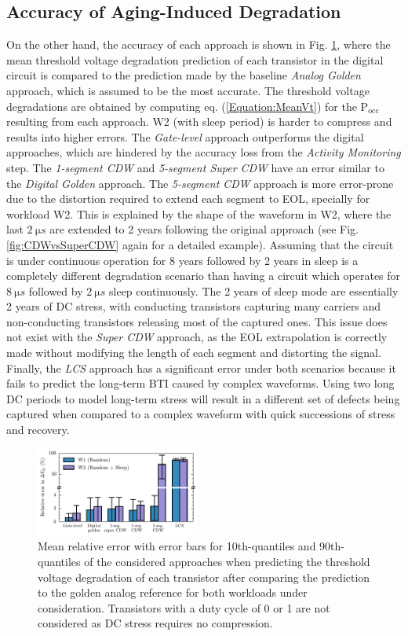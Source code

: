 \subsection{Accuracy of Aging-Induced Degradation}
On the other hand, the accuracy of each approach is shown in Fig. \ref{fig:Mean error}, where the mean threshold voltage degradation prediction of each transistor in the digital circuit is compared to the prediction made by the baseline \textit{Analog Golden} approach, which is assumed to be the most accurate. The threshold voltage degradations are obtained by computing eq. (\ref{Equation:MeanVt}) for the $\text{P}_{\text{occ}}$ resulting from each approach. W2 (with sleep period) is harder to compress and results into higher errors. The \textit{Gate-level} approach outperforms the digital approaches, which are hindered by the accuracy loss from the \textit{Activity Monitoring} step. The \textit{1-segment CDW} and \textit{5-segment Super CDW} have an error similar to the \textit{Digital Golden} approach. The \textit{5-segment CDW} approach is more error-prone due to the distortion required to extend each segment to EOL, specially for workload W2. This is explained by the shape of the waveform in W2, where the last $\qty{2}{\micro s}$ are extended to 2 years following the original approach (see Fig. \ref{fig:CDWvsSuperCDW} again for a detailed example). Assuming that the circuit is under continuous operation for 8 years followed by 2 years in sleep is a completely different degradation scenario than having a circuit which operates for $\qty{8}{\micro s}$ followed by $\qty{2}{\micro s}$ sleep continuously. The 2 years of sleep mode are essentially 2 years of DC stress, with conducting transistors capturing many carriers and non-conducting transistors releasing most of the captured ones. This issue does not exist with the \textit{Super CDW} approach, as the EOL extrapolation is correctly made without modifying the length of each segment and distorting the signal. Finally, the \textit{LCS} approach has a significant error under both scenarios because it fails to predict the long-term BTI caused by complex waveforms. Using two long DC periods to model long-term stress will result in a different set of defects being captured when compared to a complex waveform with quick successions of stress and recovery. 
\begin{figure}[!t]
    \includegraphics[width=0.48\textwidth,trim={0 1mm 0 0},clip]{images/ch2/mean_error_bar_scatter_report_plot.pdf}
    \caption{Mean relative error with error bars for 10th-quantiles and 90th-quantiles of the considered approaches when predicting the threshold voltage degradation of each transistor after comparing the prediction to the golden analog reference for both workloads under consideration. Transistors with a duty cycle of 0 or 1 are not considered as DC stress requires no compression. }
    \label{fig:Mean error}
\end{figure}
